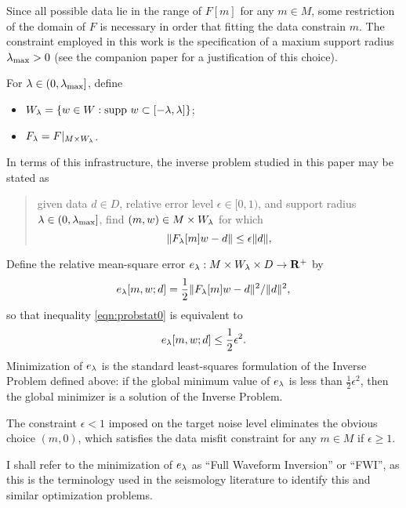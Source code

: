 Since
all possible data lie in the range of $F[m]$ for any $m \in M$, some
restriction of the domain of $F$ is necessary in order that fitting
the data constrain $m$. The constraint employed in this work is the specification
of a maxium support radius $\lambda_{\rm max} >0$ (see the companion
paper \cite{SymesChenMinkoff:21} for a justification of this choice).

For
$\lambda \in (0,\lambda_{\rm max}]$, define
\begin{itemize}
\item $W_{\lambda} = \{w \in W:
  \mbox{supp }w \subset [-\lambda,\lambda]\}$;
\item $F_{\lambda} = F|_{M \times W_{\lambda}}$.
\end{itemize}

In terms of this infrastructure, the inverse problem studied in 
this paper may be stated as

\begin{quote}
  given data $d \in D$, relative error level $\epsilon \in
  [0,1)$, and support radius $\lambda \in (0, \lambda_{\rm
    max}]$, find $(m,w) \in M \times W_{\lambda}$ for which 
\begin{equation}
  \label{eqn:probstat0}  \|F_{\lambda}[m]w-d\| \le \epsilon\|d\|,
\end{equation}
\end{quote}

Define the relative mean-square error $e_{\lambda}: M \times W_{\lambda} \times D
\rightarrow {\bf R}^+$ by
\begin{equation}
  \label{eqn:redms}
  e_{\lambda}[m,w;d]=\frac{1}{2}\|F_{\lambda}[m]w-d\|^2/\|d\|^2,
\end{equation}
so that inequality \ref{eqn:probstat0} is equivalent to
\begin{equation}
  \label{eqn:probstat1}
  e_{\lambda}[m,w;d] \le \frac{1}{2}\epsilon^2.
\end{equation}
Minimization of $e_{\lambda}$ is the standard least-squares formulation of
the Inverse Problem defined above: if the global minimum value of
$e_{\lambda}$ is less than $\frac{1}{2}\epsilon^2$, then the global
minimizer is a solution of the Inverse Problem.

 The constraint $\epsilon < 1$ imposed on the
target noise level eliminates the obvious choice $(m,0)$, which
satisfies the data misfit constraint for any $m \in M$ if $\epsilon
\ge 1$. 

 I shall refer to the minimization of $e_{\lambda}$ as
``Full Waveform Inversion'' or ``FWI'', as this is the
terminology used in the seismology literature to identify this and
similar optimization problems.

